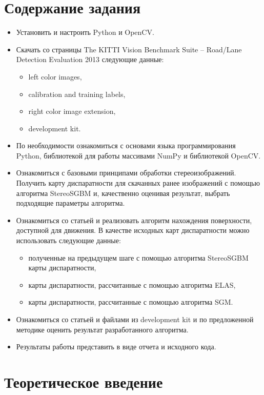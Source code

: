 \documentclass[oneside,final,12pt]{scrartcl}
\begin{document}
	\section{Содержание задания}
		\begin{itemize}
			\item Установить и настроить Python и OpenCV.
			\item  Скачать со страницы The KITTI Vision Benchmark Suite – Road/Lane Detection Evaluation 2013 следующие данные:
			\begin{itemize}
				\item  left color images,
				\item  calibration and training labels,
				\item  right color image extension,
				\item  development kit.
			\end{itemize}
			\item По необходимости ознакомиться с основами языка программирования Python, библиотекой для работы массивами NumPy и библиотекой OpenCV.
			\item Ознакомиться с базовыми принципами обработки стереоизображений. Получить карту диспаратности для скачанных ранее изображений с помощью алгоритма StereoSGBM и, качественно оценивая результат, выбрать подходящие параметры алгоритма.
			\item Ознакомиться со статьей \cite{Zhu2013} и реализовать алгоритм нахождения поверхности, доступной для движения. В качестве исходных карт диспаратности можно использовать следующие данные:
			\begin{itemize}
				\item полученные на предыдущем шаге с помощью алгоритма StereoSGBM  карты диспаратности,
				\item карты диспаратности, рассчитанные с помощью алгоритма ELAS,
				\item карты диспаратности, рассчитанные с помощью алгоритма SGM.
			\end{itemize}
			\item Ознакомиться со статьей \cite{Fritsch2013} и файлами из development kit и по предложенной методике оценить результат разработанного алгоритма.
			\item Результаты работы представить в виде отчета и исходного кода.
		\end{itemize}

	\section{Теоретическое введение}
\end{document}
